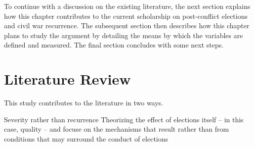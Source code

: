 \documentclass [11pt]{article}
\begin{document}
To continue with a discussion on the existing literature, the next section explains how this chapter contributes to the current scholarship on post-conflict elections and civil war recurrence. The subsequent section then describes how this chapter plans to study the argument by detailing the means by which the variables are defined and measured. The final section concludes with some next steps.

\section*{Literature Review} 

This study contributes to the literature in two ways.

Severity rather than recurrence
Theorizing the effect of elections itself -- in this case, quality -- and focuse on the mechanisms that result rather than from conditions that may surround the conduct of elections


\end{document}
